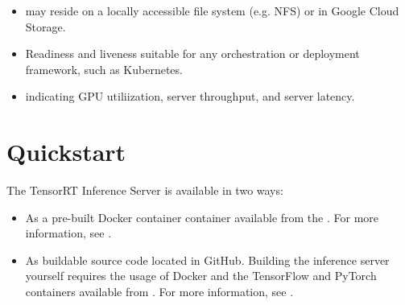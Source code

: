 \documentclass[letterpaper,10pt,english]{sphinxmanual}
\begin{document}
\begin{itemize}
\item {} 
may reside on a locally accessible file system (e.g. NFS) or in
Google Cloud Storage.

\item {} 
Readiness and liveness 
suitable for any orchestration or deployment framework, such as
Kubernetes.

\item {} 
indicating GPU utiliization, server throughput, and server latency.

\end{itemize}


\chapter{Quickstart}
\label{\detokenize{quickstart:quickstart}}\label{\detokenize{quickstart::doc}}
The TensorRT Inference Server is available in two ways:
\begin{itemize}
\item {} 
As a pre-built Docker container container available from the . For more information,
see {\hyperref[\detokenize{quickstart:section-using-a-prebuilt-docker-container}]{}}.

\item {} 
As buildable source code located in GitHub. Building the inference
server yourself requires the usage of Docker and the TensorFlow and
PyTorch containers available from .
For more information, see {\hyperref[\detokenize{quickstart:section-building-from-source-code}]{}}.

\end{itemize}
\end{document}
